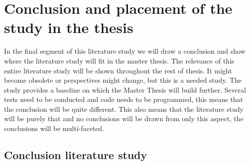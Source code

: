 

\section{Conclusion and placement of the study in the thesis}

In the final segment of this literature study we will draw a conclusion and show where the literature study will fit in the master thesis. The relevance of this entire literature study will be shown throughout the rest of thesis. It might become obsolete or perspectives might change, but this is a needed study. The study provides a baseline on which the Master Thesis will build further. Several tests need to be conducted and code needs to be programmed, this means that the conclusion will be quite different. This also means that the literature study will be purely that and no conclusions will be drawn from only this aspect, the conclusions will be multi-faceted. 

\subsection{Conclusion literature study}

